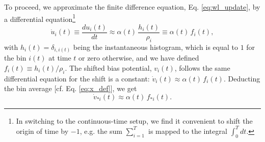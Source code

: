 \documentclass[preprint, superscriptaddress, floatfix]{revtex4-1}
\begin{document}
To proceed, we
approximate the finite difference equation, Eq. \eqref{eq:wl_update},
by a differential equation\footnote{In
  switching to the continuous-time setup,
  we find it convenient to shift the origin of time by $-1$,
  e.g. the sum $\sum_{i=1}^T$ is mapped to the integral $\int_0^T dt$.}
%
\begin{equation}
  \dot u_i(t)
  \equiv
  \frac{ d u_i(t) } { dt }
  \approx
  \alpha(t) \, \frac{ h_i(t) } { \rho_i }
  \equiv
  \alpha(t) \, f_i(t)
  ,
  \label{eq:ut_diffeq}
\end{equation}
%
with
%
$h_i(t) = \delta_{i, i(t)}$
%
being the instantaneous histogram,
which is equal to $1$
for the bin $i(t)$ at time $t$
or zero otherwise,
and we have defined
$f_i(t) \equiv h_i(t) /\rho_i$.
%
The shifted bias potential, $v_i(t)$,
follows the same differential equation
for the shift is a constant:
$\dot v_i(t) \approx \alpha(t) \, f_i(t)$.
%
Deducting the bin average [cf. Eq. \eqref{eq:x_def}],
we get
%
\begin{equation}
  \dot v_{*i}(t)
  \approx
  \alpha(t) \, f_{*i}(t)
  .
  \label{eq:vt_diffeq}
\end{equation}
\end{document}

